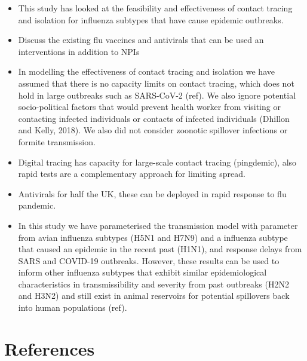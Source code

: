 \documentclass{article}
\begin{document}
\begin{itemize}
\item This study has looked at the feasibility and effectiveness of contact tracing and isolation for influenza subtypes that have cause epidemic outbreaks.
\item Discuss the existing flu vaccines and antivirals that can be used an interventions in addition to NPIs
\item In modelling the effectiveness of contact tracing and isolation we have assumed that there is no capacity limits on contact tracing, which does not hold in large outbreaks such as SARS-CoV-2 (ref). We also ignore potential socio-political factors that would prevent health worker from visiting or contacting infected individuals or contacts of infected individuals (Dhillon and Kelly, 2018). We also did not consider zoonotic spillover infections or formite transmission.
\item Digital tracing has capacity for large-scale contact tracing (pingdemic), also rapid tests are a complementary approach for limiting spread.
\item Antivirals for half the UK, these can be deployed in rapid response to flu pandemic.
\item In this study we have parameterised the transmission model with parameter from avian influenza subtypes (H5N1 and H7N9) and a influenza subtype that caused an epidemic in the recent past (H1N1), and response delays from SARS and COVID-19 outbreaks. However, these results can be used to inform other influenza subtypes that exhibit similar epidemiological characteristics in transmissibility and severity from past outbreaks (H2N2 and H3N2) and still exist in animal reservoirs for potential spillovers back into human populations (ref).
\end{itemize}


\section{References}
\end{document}
